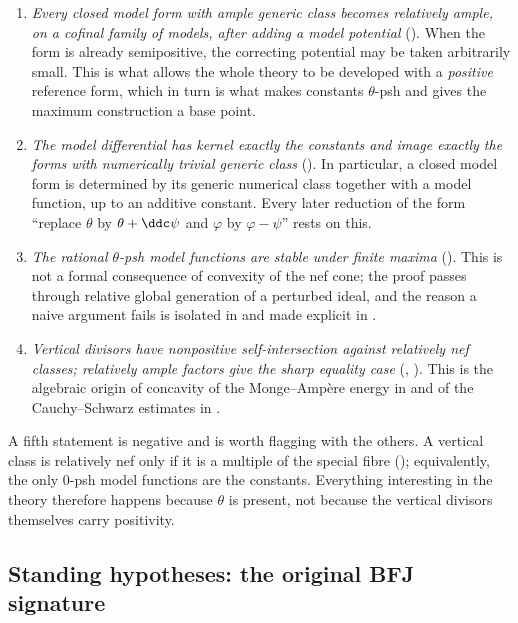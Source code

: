 \begin{enumerate}
\item \emph{Every closed model form with ample generic class becomes
 relatively ample, on a cofinal family of models, after adding a model
 potential} ().  When the form is
 already semipositive, the correcting potential may be taken arbitrarily
 small.  This is what allows the whole theory to be developed with a
 \emph{positive} reference form, which in turn is what makes constants
 $\theta$-psh and gives the maximum construction a base point.
\item \emph{The model differential has kernel exactly the constants and
 image exactly the forms with numerically trivial generic class}
 ().  In particular, a closed model form is
 determined by its generic numerical class together with a model function,
 up to an additive constant.  Every later reduction of the form ``replace
 $\theta$ by $\theta+\ddc\psi$ and $\varphi$ by $\varphi-\psi$''
 rests on this.
\item \emph{The rational $\theta$-psh model functions are stable under
 finite maxima} ().  This is not a formal consequence of
 convexity of the nef cone; the proof passes through relative global
 generation of a perturbed ideal, and the reason a naive argument fails is
 isolated in  and made explicit in
 .
\item \emph{Vertical divisors have nonpositive self-intersection against
 relatively nef classes; relatively ample factors give the sharp equality case}
 (, ).  This is
 the algebraic origin of concavity of the Monge--Amp\`ere energy in
  and of the Cauchy--Schwarz estimates in
 .
\end{enumerate}

A fifth statement is negative and is worth flagging with the others.  A
vertical class is relatively nef only if it is a multiple of the special
fibre (); equivalently, the only
$0$-psh model functions are the constants.  Everything interesting in the
theory therefore happens because $\theta$ is present, not because the
vertical divisors themselves carry positivity.

\subsection{Standing hypotheses: the original BFJ signature}
\label{sec:ch20-hypotheses}


